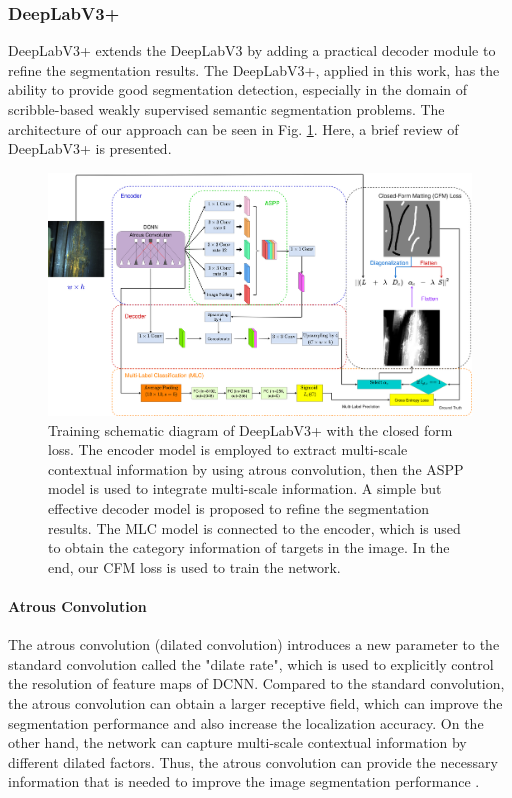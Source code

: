 \documentclass[journal]{IEEEtran}
\begin{document}
\subsubsection{DeepLabV3+}
DeepLabV3+ \cite{chen2018encoder} extends the DeepLabV3 \cite{chen2017rethinking} by adding a practical decoder module to refine the segmentation results. The DeepLabV3+, applied in this work, has the ability to provide good segmentation detection, especially in the domain of scribble-based weakly supervised semantic segmentation problems. The architecture of our approach can be seen in Fig. \ref{fg:closed-form-loss-trianing}. Here, a brief review of DeepLabV3+ is presented. 
\begin{figure}[t]
    \centering
    \includegraphics[width=1.8\columnwidth]{imgs/closed-form-segmentation.png}
    \caption{Training schematic diagram of DeepLabV3+ with the closed form loss. The encoder model is employed to extract multi-scale contextual information by using atrous convolution, then the ASPP model is used to integrate multi-scale information. A simple but effective decoder model is proposed to refine the segmentation results. The MLC model is connected to the encoder, which is used to obtain the category information of targets in the image. In the end, our CFM loss is used to train the network. }
    \label{fg:closed-form-loss-trianing}
\end{figure}

\paragraph{Atrous Convolution}
The atrous convolution (dilated convolution) introduces a new parameter to the standard convolution called the "dilate rate", which is used to explicitly control the resolution of feature maps of DCNN. Compared to the standard convolution, the atrous convolution can obtain a larger receptive field, which can improve the segmentation performance and also increase the localization accuracy. On the other hand, the network can capture multi-scale contextual information by different dilated factors. Thus, the atrous convolution can provide the necessary information that is needed to improve the image segmentation performance \cite{papandreou2015modeling,chen2017deeplab}.
\end{document}
